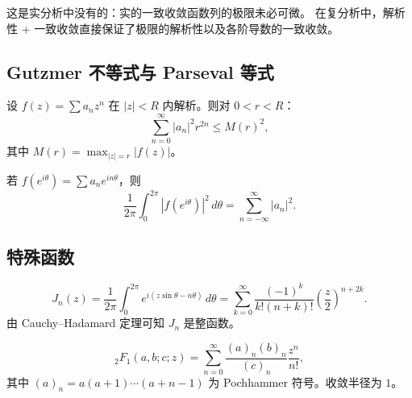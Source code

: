 \begin{remark}
这是实分析中没有的：实的一致收敛函数列的极限未必可微。
在复分析中，解析性 + 一致收敛直接保证了极限的解析性以及各阶导数的一致收敛。
\end{remark}

\subsection{Gutzmer 不等式与 Parseval 等式}

\begin{theorem}
设 $f(z) = \sum a_n z^n$ 在 $|z| < R$ 内解析。则对 $0 < r < R$：
\[
  \sum_{n=0}^{\infty} |a_n|^2 r^{2n} \leq M(r)^2,
\]
其中 $M(r) = \max_{|z|=r} |f(z)|$。
\end{theorem}

\begin{theorem}[Parseval 等式]
若 $f(e^{i\theta}) = \sum a_n e^{in\theta}$，则
\[
  \frac{1}{2\pi}\int_0^{2\pi} |f(e^{i\theta})|^2\,d\theta = \sum_{n=-\infty}^{\infty} |a_n|^2.
\]
\end{theorem}

\subsection{特殊函数}

\begin{definition}
\[
  J_n(z) = \frac{1}{2\pi}\int_0^{2\pi} e^{i(z\sin\theta - n\theta)}\,d\theta
  = \sum_{k=0}^{\infty} \frac{(-1)^k}{k!(n+k)!}\left(\frac{z}{2}\right)^{n+2k}.
\]
由 Cauchy--Hadamard 定理可知 $J_n$ 是整函数。
\end{definition}

\begin{definition}
\[
  {}_2F_1(a,b;c;z) = \sum_{n=0}^{\infty}
  \frac{(a)_n (b)_n}{(c)_n}\frac{z^n}{n!},
\]
其中 $(a)_n = a(a+1)\cdots(a+n-1)$ 为 Pochhammer 符号。收敛半径为 $1$。
\end{definition}
